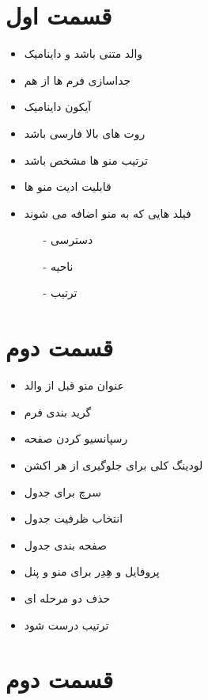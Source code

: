 \documentclass[12pt]{article}
\begin{document}


\section{قسمت اول}


\begin{itemize}
	\item والد متنی باشد و داینامیک 
	\qquad \checkmark 
	\item جداسازی فرم ها از هم
	\qquad \checkmark 
	\item آیکون داینامیک
	\qquad \checkmark 
	\item روت های بالا فارسی باشد
	\qquad \checkmark 
	\item ترتیب منو ها مشخص باشد
	\qquad \checkmark 
	\item قابلیت ادیت منو ها
	\item فیلد هایی که به منو اضافه می شوند
	\begin{itemize}
		\item[-] دسترسی
		\item[-] ناحیه
		\item[-] ترتیب
		\qquad \checkmark 
	\end{itemize}
\end{itemize}



\section{قسمت دوم}


\begin{itemize}
	\item عنوان منو قبل از والد
	\qquad \checkmark 
	\item گرید بندی فرم
	\item رسپانسیو کردن صفحه
	\qquad \checkmark 
	\item لودینگ کلی برای جلوگیری از هر اکشن
	\qquad \checkmark 
	\item سرچ برای جدول
	\item انتخاب ظرفیت جدول
	\qquad \checkmark 
	\item صفحه بندی جدول
	\qquad \checkmark 
	\item پروفایل و هِدِر برای منو و پنل
	\item حذف دو مرحله ای
	\item ترتیب درست شود
	\qquad \checkmark 
\end{itemize}




\section{قسمت دوم}
\end{document}
